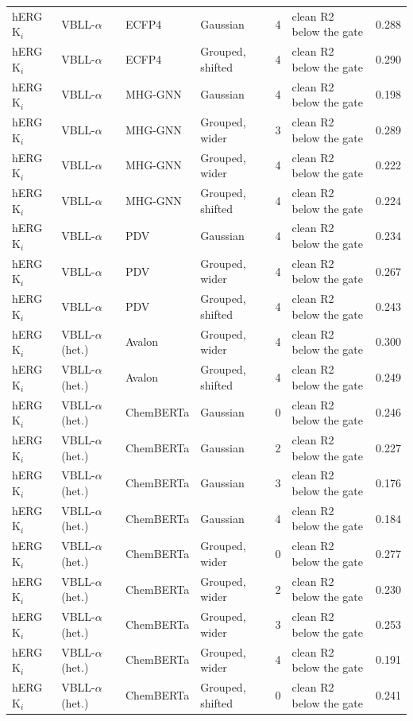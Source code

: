 {\begin{longtable}{llllcll}
hERG K$_i$ & VBLL-$\alpha$ & ECFP4 & Gaussian & 4 & clean R2 below the gate & 0.288 \\
hERG K$_i$ & VBLL-$\alpha$ & ECFP4 & Grouped, shifted & 4 & clean R2 below the gate & 0.290 \\
hERG K$_i$ & VBLL-$\alpha$ & MHG-GNN & Gaussian & 4 & clean R2 below the gate & 0.198 \\
hERG K$_i$ & VBLL-$\alpha$ & MHG-GNN & Grouped, wider & 3 & clean R2 below the gate & 0.289 \\
hERG K$_i$ & VBLL-$\alpha$ & MHG-GNN & Grouped, wider & 4 & clean R2 below the gate & 0.222 \\
hERG K$_i$ & VBLL-$\alpha$ & MHG-GNN & Grouped, shifted & 4 & clean R2 below the gate & 0.224 \\
hERG K$_i$ & VBLL-$\alpha$ & PDV & Gaussian & 4 & clean R2 below the gate & 0.234 \\
hERG K$_i$ & VBLL-$\alpha$ & PDV & Grouped, wider & 4 & clean R2 below the gate & 0.267 \\
hERG K$_i$ & VBLL-$\alpha$ & PDV & Grouped, shifted & 4 & clean R2 below the gate & 0.243 \\
hERG K$_i$ & VBLL-$\alpha$ (het.) & Avalon & Grouped, wider & 4 & clean R2 below the gate & 0.300 \\
hERG K$_i$ & VBLL-$\alpha$ (het.) & Avalon & Grouped, shifted & 4 & clean R2 below the gate & 0.249 \\
hERG K$_i$ & VBLL-$\alpha$ (het.) & ChemBERTa & Gaussian & 0 & clean R2 below the gate & 0.246 \\
hERG K$_i$ & VBLL-$\alpha$ (het.) & ChemBERTa & Gaussian & 2 & clean R2 below the gate & 0.227 \\
hERG K$_i$ & VBLL-$\alpha$ (het.) & ChemBERTa & Gaussian & 3 & clean R2 below the gate & 0.176 \\
hERG K$_i$ & VBLL-$\alpha$ (het.) & ChemBERTa & Gaussian & 4 & clean R2 below the gate & 0.184 \\
hERG K$_i$ & VBLL-$\alpha$ (het.) & ChemBERTa & Grouped, wider & 0 & clean R2 below the gate & 0.277 \\
hERG K$_i$ & VBLL-$\alpha$ (het.) & ChemBERTa & Grouped, wider & 2 & clean R2 below the gate & 0.230 \\
hERG K$_i$ & VBLL-$\alpha$ (het.) & ChemBERTa & Grouped, wider & 3 & clean R2 below the gate & 0.253 \\
hERG K$_i$ & VBLL-$\alpha$ (het.) & ChemBERTa & Grouped, wider & 4 & clean R2 below the gate & 0.191 \\
hERG K$_i$ & VBLL-$\alpha$ (het.) & ChemBERTa & Grouped, shifted & 0 & clean R2 below the gate & 0.241 \\

\end{longtable}}
